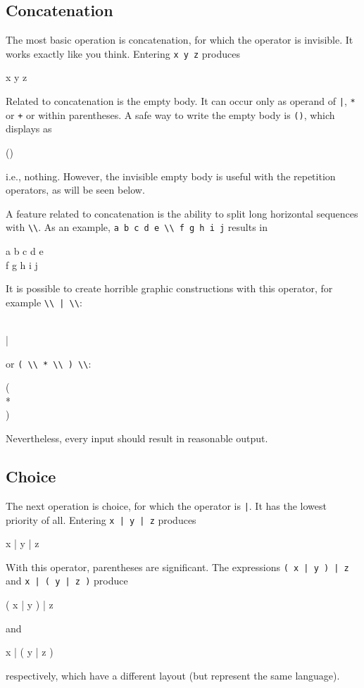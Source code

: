 \documentclass[a4paper]{article}
\begin{document}
\subsection{Concatenation}

The most basic operation is concatenation, for which the operator is
invisible. It works exactly like you think. Entering \verb!x y z!
produces
\begin{rail}
x y z
\end{rail}
Related to concatenation is the empty body. It can occur only as operand
of \verb!|!, \verb!*! or \verb!+! or within parentheses. A safe way to
write the empty body is \verb!()!, which displays as
\begin{rail}
()
\end{rail}
i.e., nothing. However, the invisible empty body is useful with the
repetition operators, as will be seen below.

A feature related to concatenation is the ability to split long
horizontal sequences with \verb!\\!.
As an example,
\verb!a b c d e \\ f g h i j! results in
\begin{rail}
a b c d e \\ f g h i j
\end{rail}
It is possible to create horrible graphic constructions with this
operator, for example \verb!\\ | \\!:
\begin{rail}
\\ | \\
\end{rail}
or \verb!( \\ * \\ ) \\!:
\begin{rail}
( \\ * \\ ) \\
\end{rail}
Nevertheless, every input should result in reasonable output.

\subsection{Choice}

The next operation is choice, for which the operator is \verb!|!.
It has the lowest priority of all. Entering \verb!x | y | z! produces
\begin{rail}
x | y | z
\end{rail}
With this operator, parentheses are significant. The expressions
\verb!( x | y ) | z! and \verb!x | ( y | z )! produce
\begin{rail}
( x | y ) | z
\end{rail}
and
\begin{rail}
x | ( y | z )
\end{rail}
respectively, which have a different layout (but represent the same
language).
\end{document}
